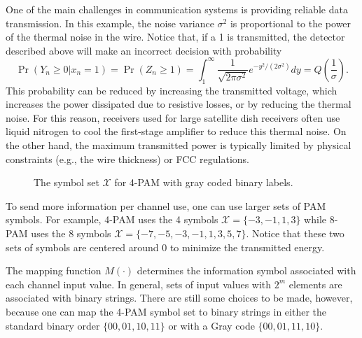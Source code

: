 One of the main challenges in communication systems is providing reliable data transmission.
In this example, the noise variance $\sigma^2$ is proportional to the power of the thermal noise in the wire.
Notice that, if a 1 is transmitted, the detector described above will make an incorrect decision with probability
\[ \Pr \left( Y_n \geq 0 | x_n = 1 \right) = \Pr \left( Z_n \geq 1 \right) = \int_{1}^{\infty}  \frac{1}{\sqrt{2\pi \sigma^2}} e^{-y^2 / (2\sigma^2)} dy = Q\left( \frac{1}{\sigma} \right).\]
This probability can be reduced by increasing the transmitted voltage, which increases the power dissipated due to resistive losses, or by reducing the thermal noise.
For this reason, receivers used for large satellite dish receivers often use liquid nitrogen to cool the first-stage amplifier to reduce this thermal noise.
On the other hand, the maximum transmitted power is typically limited by physical constraints (e.g., the wire thickness) or FCC regulations.

\begin{figure}[t]
\begin{center}
\scalebox{0.75}
{}
\end{center}
\vspace{-6mm}
\caption{The symbol set $\mathcal{X}$ for 4-PAM with gray coded binary labels.}
\end{figure}

To send more information per channel use, one can use larger sets of PAM symbols.
For example, 4-PAM uses the 4 symbols $\mathcal{X}=\{ -3,-1,1,3 \}$ while 8-PAM uses the 8 symbols $\mathcal{X}=\{-7,-5,-3,-1,1,3,5,7\}$.
Notice that these two sets of symbols are centered around 0 to minimize the transmitted energy.

The mapping function $M(\cdot)$ determines the information symbol associated with each channel input value.
In general, sets of input values with $2^m$ elements are associated with binary strings.
There are still some choices to be made, however, because one can map the 4-PAM symbol set to binary strings in either the standard binary order $\{00,01,10,11\}$ or with a Gray code $\{00,01,11,10\}$.

